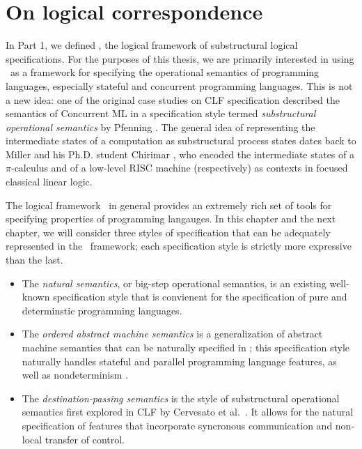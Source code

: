 \chapter{On logical correspondence}

In Part 1, we defined \sls, the logical framework of substructural
logical specifications. For the purposes of this thesis, we are
primarily interested in using \sls~as a framework for specifying the
operational semantics of programming languages, especially stateful
and concurrent programming languages. This is not a new idea: one of
the original case studies on CLF specification described the semantics
of Concurrent ML \cite{cervesato02concurrent} in a specification style
termed {\it substructural operational semantics} by Pfenning
\cite{pfenning04substructural}. The general idea of representing the
intermediate states of a computation as substructural process states
dates back to Miller \cite{miller92pi} and his Ph.D. student Chirimar
\cite{chirimar95proof}, who encoded the intermediate states of a
$\pi$-calculus and of a low-level RISC machine (respectively) as
contexts in focused classical linear logic.

The logical framework \sls~in general provides an extremely rich set
of tools for specifying properties of programming langauges. In this
chapter and the next chapter, we will consider three styles of
specification that can be adequately represented in the
\sls~framework; each specification style is strictly more expressive
than the last.

\begin{itemize}
\item The {\it natural semantics}, or big-step operational semantics,
  is an existing well-known specification style that is convienent for
  the specification of pure and determinstic programming
  languages.

\item The {\it ordered abstract machine semantics} is a generalization
  of abstract machine semantics that can be naturally specified in
  \sls; this specification style naturally handles stateful and
  parallel programming language features, as well as nondeterminism
  \cite{pfenning09substructural}.

\item The {\it destination-passing semantics} is the style of
  substructural operational semantics first explored in CLF by
  Cervesato et al.~\cite{cervesato02concurrent}. It allows for the
  natural specification of features that incorporate syncronous
  communication and non-local transfer of control.
\end{itemize}

